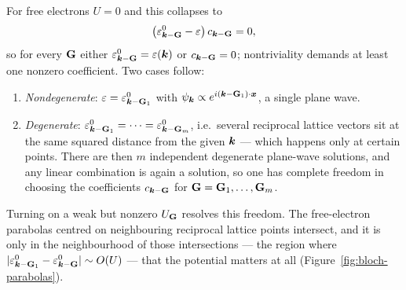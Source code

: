 For free electrons $U = 0$ and this collapses to
\begin{equation}
    \bigl( \varepsilon^0_{\lvect{k}-\cvect{G}} - \varepsilon \bigr)\, c_{\lvect{k}-\cvect{G}} = 0,
\end{equation}
so for every $\cvect{G}$ either $\varepsilon^0_{\lvect{k}-\cvect{G}} = \varepsilon(\lvect{k})$ or $c_{\lvect{k}-\cvect{G}} = 0$; nontriviality demands at least one nonzero coefficient. Two cases follow:
\begin{enumerate}
    \item \emph{Nondegenerate}: $\varepsilon = \varepsilon^0_{\lvect{k}-\cvect{G}_1}$ with $\psi_{\lvect{k}} \propto e^{i(\lvect{k}-\cvect{G}_1)\cdot\lvect{x}}$, a single plane wave.
    \item \emph{Degenerate}: $\varepsilon^0_{\lvect{k}-\cvect{G}_1} = \cdots = \varepsilon^0_{\lvect{k}-\cvect{G}_m}$, i.e.\ several reciprocal lattice vectors sit at the same squared distance from the given $\bm{k}$ --- which happens only at certain points. There are then $m$ independent degenerate plane-wave solutions, and any linear combination is again a solution, so one has complete freedom in choosing the coefficients $c_{\lvect{k}-\cvect{G}}$ for $\cvect{G} = \cvect{G}_1,\ldots,\cvect{G}_m$.
\end{enumerate}

Turning on a weak but nonzero $U_{\cvect{G}}$ resolves this freedom. The free-electron parabolas centred on neighbouring reciprocal lattice points intersect, and it is only in the neighbourhood of those intersections --- the region where $|\varepsilon^0_{\lvect{k}-\cvect{G}_1} - \varepsilon^0_{\lvect{k}-\cvect{G}}| \sim O(U)$ --- that the potential matters at all (Figure~\ref{fig:bloch-parabolas}).

